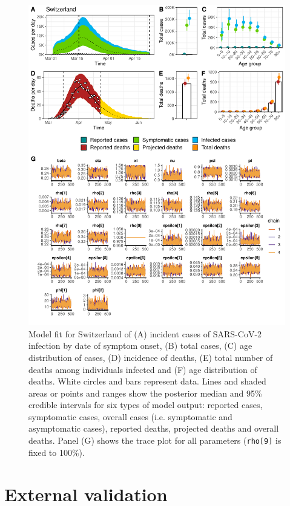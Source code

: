 \documentclass{article}
\begin{document}
\begin{figure}[h]
	\centering
	\includegraphics[width=\linewidth]{../format_output/figures_v3/supp_fit_switzerland.pdf}
	\caption{Model fit for Switzerland of (A) incident cases of SARS-CoV-2 infection by date of symptom onset, (B) total cases, (C) age distribution of cases, (D) incidence of deaths, (E) total number of deaths among individuals infected and (F) age distribution of deaths. White circles and bars represent data. Lines and shaded areas or points and ranges show the posterior median and 95\% credible intervals for six types of model output: reported cases, symptomatic cases, overall cases (i.e. symptomatic and asymptomatic cases), reported deaths, projected deaths and overall deaths. Panel (G) shows the trace plot for all parameters (\texttt{rho[9]} is fixed to 100\%).}
	\label{fig:fitch}
\end{figure}


	
\clearpage
\section{External validation}
\end{document}
